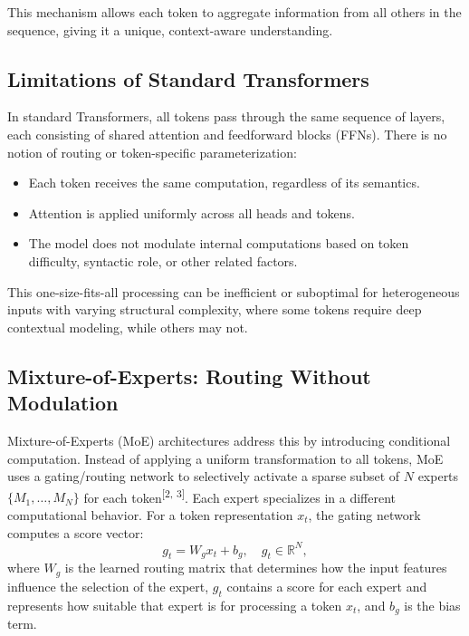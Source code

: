 \documentclass{article}
\begin{document}
\noindent
This mechanism allows each token to aggregate information from all others in the sequence, giving it a unique, context-aware understanding.

\subsection{Limitations of Standard Transformers}

In standard Transformers, all tokens pass through the same sequence of layers, each consisting of shared attention and feedforward blocks (FFNs). There is no notion of routing or token-specific parameterization:

\begin{itemize}
    \item Each token receives the same computation, regardless of its semantics. 
    \item Attention is applied uniformly across all heads and tokens. 
    \item The model does not modulate internal computations based on token difficulty, syntactic role, or other related factors. 
\end{itemize}

\noindent
This one-size-fits-all processing can be inefficient or suboptimal for heterogeneous inputs with varying structural complexity, where some tokens require deep contextual modeling, while others may not.


\subsection{Mixture-of-Experts: Routing Without Modulation}

\vspace{4pt}
Mixture-of-Experts (MoE) architectures address this by introducing conditional computation. Instead of applying a uniform transformation to all tokens, MoE uses a gating/routing network to selectively activate a sparse subset of $N$ experts $\{M_1, \ldots, M_N\}$ for each token\textsuperscript{[2, 3]}. Each expert specializes in a different computational behavior. For a token representation $x_t$, the gating network computes a score vector:
\[
g_t = W_g x_t + b_g, \quad g_t \in \mathbb{R}^N,
\]
where \( W_g \) is the learned routing matrix that determines how the input features influence the selection of the expert, \( g_t \) contains a score for each expert and represents how suitable that expert is for processing a token \( x_t \), and \( b_g \) is the bias term.
\end{document}

